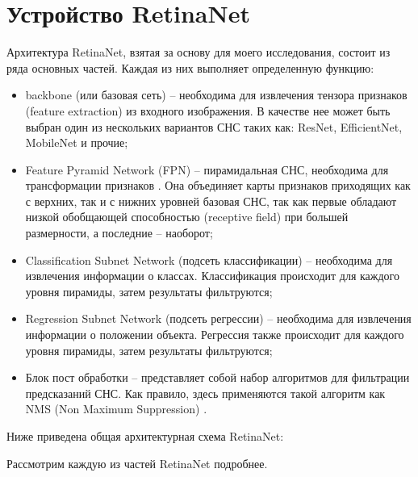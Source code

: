 \section{Устройство RetinaNet}

Архитектура RetinaNet, взятая за основу для моего исследования, состоит из ряда основных частей. Каждая из них выполняет определенную функцию:
\begin{itemize}
    \item backbone (или базовая сеть) -- необходима для извлечения тензора признаков (feature extraction) из входного изображения. В качестве нее может быть выбран один из нескольких вариантов СНС таких как: ResNet, EfficientNet, MobileNet и прочие;
    \item Feature Pyramid Network (FPN) -- пирамидальная СНС, необходима для трансформации признаков \cite{lib-fpn}. Она объединяет карты признаков приходящих как с верхних, так и с нижних уровней базовая СНС, так как первые обладают низкой обобщающей способностью (receptive field) при большей размерности, а последние -- наоборот;
    \item Classification Subnet Network (подсеть классификации) -- необходима для извлечения информации о классах. Классификация происходит для каждого уровня пирамиды, затем результаты фильтруются;
    \item Regression Subnet Network (подсеть регрессии) -- необходима для извлечения информации о положении объекта. Регрессия также происходит для каждого уровня пирамиды, затем результаты фильтруются;
    \item Блок пост обработки -- представляет собой набор алгоритмов для фильтрации предсказаний СНС. Как правило, здесь применяются такой алгоритм как NMS (Non Maximum Suppression) \cite{lib-nms}.
\end{itemize}

Ниже приведена общая архитектурная схема RetinaNet:


Рассмотрим каждую из частей RetinaNet подробнее.








\clearpage